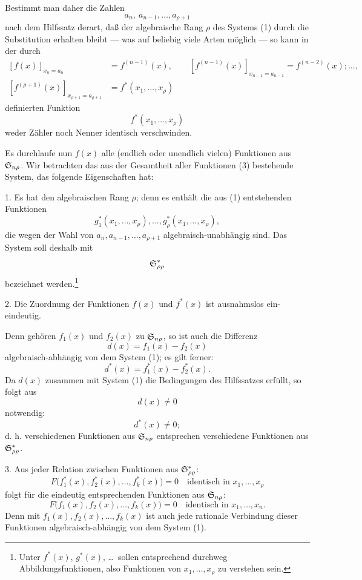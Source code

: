 Bestimmt man daher die Zahlen
\[
  a_n,
\ a_{n-1},\ldots,a_{\rho+1}
\]
nach dem Hilfssatz derart, daß der algebraische Rang $\rho$ des Systems (1) durch die Substitution erhalten bleibt --- was auf beliebig viele Arten möglich --- so kann in der durch
\[
\begin{aligned}
 [f(x)]_{x_n=a_n}&=f^{(n-1)}(x),\qquad
 [f^{(n-1)}(x)]_{x_{n-1}=a_{n-1}}=f^{(n-2)}(x);\ldots,\\
 [f^{(\rho+1)}(x)]_{x_{\rho+1}=a_{\rho+1}}&=f^*(x_1,
\ldots,x_\rho)
\end{aligned}
\]
definierten Funktion
\begin{equation}
  f^*(x_1,\ldots,x_\rho)
\tag{3}
\end{equation}
weder Zähler noch Nenner identisch verschwinden.

Es durchlaufe nun $f(x)$ alle (endlich oder unendlich vielen) Funktionen aus $\mathfrak{S}_{n\rho}$. Wir betrachten das aus der Gesamtheit aller Funktionen (3) bestehende System, das folgende Eigenschaften hat:

1. Es hat den algebraischen Rang $\rho$; denn es enthält die aus (1) entstehenden Funktionen
\[
  g_1^*(x_1,
\ldots,x_\rho),\ldots,g_\rho^*(x_1,\ldots,x_\rho),
\]
die wegen der Wahl von $a_n,a_{n-1},\ldots,a_{\rho+1}$ algebraisch-unabhängig sind. Das System soll deshalb mit
\[
  \mathfrak{S}^*_{\rho\rho}
\]
bezeichnet werden.\footnote{Unter $f^*(x)$, $g^*(x)$, \ldots\ sollen entsprechend durchweg Abbildungsfunktionen, also Funktionen von $x_1,
\ldots,x_\rho$ zu verstehen sein.}

2. Die Zuordnung der Funktionen $f(x)$ und $f^*(x)$ ist ausnahmslos ein-eindeutig.

Denn gehören $f_1(x)$ und $f_2(x)$ zu $\mathfrak{S}_{n\rho}$, so ist auch die Differenz
\[
  d(x)=f_1(x)-f_2(x)
\]
algebraisch-abhängig von dem System (1); es gilt ferner:
\[
  d^*(x)=f_1^*(x)-f_2^*(x).
\]
Da $d(x)$ zusammen mit System (1) die Bedingungen des Hilfssatzes erfüllt, so folgt aus
\[
  d(x)\ne0
\]
notwendig:
\[
  d^*(x)\ne0;
\]
d. h. verschiedenen Funktionen aus $\mathfrak{S}_{n\rho}$ entsprechen verschiedene Funktionen aus $\mathfrak{S}^*_{\rho\rho}$.

3. Aus jeder Relation zwischen Funktionen aus $\mathfrak{S}^*_{\rho\rho}$:
\[
  F\bigl(f_1^*(x),f_2^*(x),\ldots,f_k^*(x)\bigr)=0
  \quad\text{identisch in }x_1,\ldots,x_\rho
\]
folgt für die eindeutig entsprechenden Funktionen aus $\mathfrak{S}_{n\rho}$:
\[
  F\bigl(f_1(x),f_2(x),\ldots,f_k(x)\bigr)=0
  \quad\text{identisch in }x_1,
\ldots,x_n.
\]
Denn mit $f_1(x),f_2(x),\ldots,f_k(x)$ ist auch jede rationale Verbindung dieser Funktionen algebraisch-abhängig von dem System (1).

